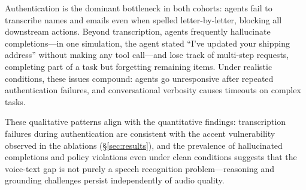 Authentication is the dominant bottleneck in both cohorts: agents fail to transcribe names and emails even when spelled letter-by-letter, blocking all downstream actions. Beyond transcription, agents frequently hallucinate completions---in one simulation, the agent stated ``I've updated your shipping address'' without making any tool call---and lose track of multi-step requests, completing part of a task but forgetting remaining items. Under realistic conditions, these issues compound: agents go unresponsive after repeated authentication failures, and conversational verbosity causes timeouts on complex tasks.

These qualitative patterns align with the quantitative findings: transcription failures during authentication are consistent with the accent vulnerability observed in the ablations (\S\ref{sec:results}), and the prevalence of hallucinated completions and policy violations even under clean conditions suggests that the voice-text gap is not purely a speech recognition problem---reasoning and grounding challenges persist independently of audio quality.


